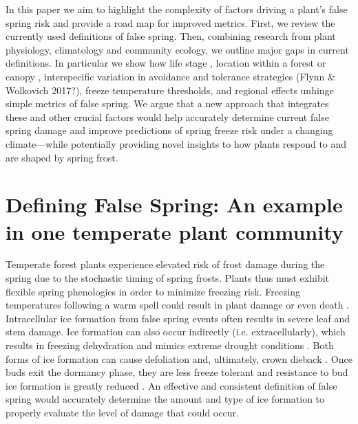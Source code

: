 \documentclass{article}\usepackage[]{graphicx}\usepackage[]{color}
\begin{document}
In this paper we aim to highlight the complexity of factors driving a plant's false spring risk and provide a road map for improved metrics. First, we review the currently used definitions of false spring. Then, combining research from plant physiology, climatology and community ecology, we outline major gaps in current definitions. In particular we show how life stage \citep{Caffarra2011}, location within a forest or canopy \citep{Augspurger2013}, interspecific variation in avoidance and tolerance strategies (Flynn \& Wolkovich 2017?), freeze temperature thresholds, and regional effects \citep{Martin2010} unhinge simple metrics of false spring. We argue that a new approach that integrates these and other crucial factors would help accurately determine current false spring damage and improve predictions of spring freeze risk under a changing climate---while potentially providing novel insights to how plants respond to and are shaped by spring frost. %

\section{Defining False Spring: An example in one temperate plant community}
Temperate forest plants experience elevated risk of frost damage during the spring due to the stochastic timing of spring frosts. 
Plants thus must exhibit flexible spring phenologies in order to minimize freezing risk. Freezing temperatures following a warm spell could result in plant damage or even death \citep{Ludlum1968, Mock2007}. Intracellular ice formation from false spring events often results in severe leaf and stem damage. Ice formation can also occur indirectly (i.e. extracellularly), which results in freezing dehydration and mimics extreme drought conditions \citep{Pearce2001, Beck2004, Hofmann2015}. Both forms of ice formation can cause defoliation and, ultimately, crown dieback \citep{Gu2008}. Once buds exit the dormancy phase, they are less freeze tolerant and resistance to bud ice formation is greatly reduced \citep{Taschler2004, Lenz2013, Vitasse2014a}. An effective and consistent definition of false spring would accurately determine the amount and type of ice formation to properly evaluate the level of damage that could occur.
\end{document}
